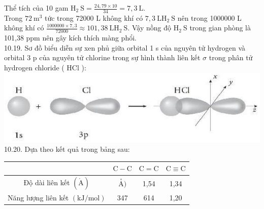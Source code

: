 \documentclass[10pt]{article}
\def\AA{\mathring{\mathrm{A}}}
\begin{document}
Thể tích của 10 gam $\mathrm{H}_{2} \mathrm{~S}=\frac{24,79 \times 10}{34}=7,3 \mathrm{~L}$.\\
Trong $72 \mathrm{~m}^{3}$ tức trong 72000 L không khí có $7,3 \mathrm{~L} \mathrm{H}_{2} \mathrm{~S}$ nên trong 1000000 L không khí có $\frac{1000000 \times 7,3}{72000} \approx 101,38 \mathrm{~L} \mathrm{H}_{2} \mathrm{~S}$. Vậy nồng độ $\mathrm{H}_{2} \mathrm{~S}$ trong gian phòng là 101,38 ppm nên gây kích thích màng phổi.\\
10.19. Sơ đồ biểu diễn sự xen phủ giữa orbital 1 s của nguyên tử hydrogen và orbital 3 p của nguyên tử chlorine trong sự hình thành liên kết $\sigma$ trong phân tử hydrogen chloride ( HCl ):\\
\includegraphics[max width=\textwidth, center]{2025_10_23_57761e23b8c46a11c3efg-26}\\
10.20. Dựa theo kết quả trong bảng sau:

\begin{center}
\begin{tabular}{|c|c|c|c|}
\hline
 & $\mathrm{C}-\mathrm{C}$ & $\mathrm{C}=\mathrm{C}$ & $\mathrm{C} \equiv \mathrm{C}$ \\
\hline
Độ dài liên kết $(\AA)$ & $\stackrel{\circ}{\mathrm{A}})$ & 1,54 & 1,34 \\
\hline
Năng lượng liên kết $(\mathrm{kJ} / \mathrm{mol})$ & 347 & 614 & 1,20 \\
\hline
\end{tabular}
\end{center}
\end{document}
